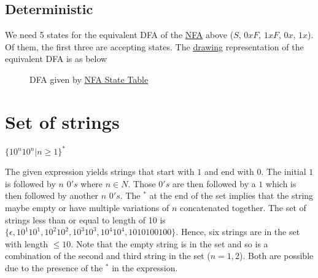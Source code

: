 \documentclass[11pt,letterpaper]{article}
\begin{document}
\subsection{Deterministic}
We need 5 states for the equivalent DFA of the \hyperref[fig:nfa]{NFA} above ($S$, $0xF$, $1xF$, $0x$, $1x$). Of them, the first three are accepting states. The \hyperref[fig:dfa]{drawing} representation of the equivalent DFA is as below
\begin{figure}[!ht]
\label{fig:dfa}
\centering
{}
\caption{DFA given by \hyperref[tab:nfa]{NFA State Table}}
\end{figure}

\section{Set of strings}
\begin{center} $\{10^n10^n | n \geq 1\}^*$ \end{center}
The given expression yields strings that start with $1$ and end with $0$. The initial $1$ is followed by $n$ $0's$ where $n \in N$. Those $0's$ are then followed by a $1$ which is then followed by another $n$ $0's$. The $^*$ at the end of the set implies that the string maybe empty or have multiple variations of $n$ concatenated together.
The set of strings less than or equal to length of 10 is $\{\epsilon, 10^{1}10^{1}, 10^{2}10^{2}, 10^{3}10^{3}, 10^{4}10^{4}, 1010100100\}$. Hence, six strings are in the set with length $\leq 10$. Note that the empty string is in the set and so is a combination of the second and third string in the set ($n=1,2$). Both are possible due to the presence of the $^*$ in the expression.
\end{document}
